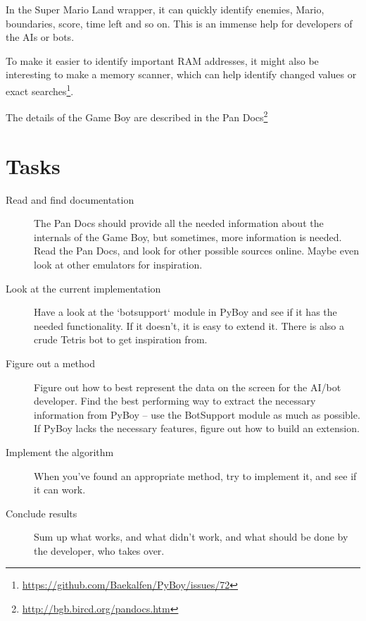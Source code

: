 \documentclass[11pt]{report} %
\begin{document}
In the Super Mario Land wrapper, it can quickly identify enemies, Mario, boundaries, score, time left and so on. This is an immense help for developers of the AIs or bots.

To make it easier to identify important RAM addresses, it might also be interesting to make a memory scanner, which can help identify changed values or exact searches\footnote{\url{https://github.com/Baekalfen/PyBoy/issues/72}}.

The details of the Game Boy are described in the Pan Docs\footnote{\url{http://bgb.bircd.org/pandocs.htm}}

\section*{Tasks}
\begin{description}
    \item [Read and find documentation]
        The Pan Docs should provide all the needed information about the internals of the Game Boy, but sometimes, more information is needed. Read the Pan Docs, and look for other possible sources online. Maybe even look at other emulators for inspiration.

    \item [Look at the current implementation]
        Have a look at the `botsupport` module in PyBoy and see if it has the needed functionality. If it doesn't, it is easy to extend it. There is also a crude Tetris bot to get inspiration from.

    \item [Figure out a method]
        Figure out how to best represent the data on the screen for the AI/bot developer. Find the best performing way to extract the necessary information from PyBoy -- use the BotSupport module as much as possible. If PyBoy lacks the necessary features, figure out how to build an extension.

    \item [Implement the algorithm]
        When you've found an appropriate method, try to implement it, and see if it can work.

    \item [Conclude results]
        Sum up what works, and what didn't work, and what should be done by the developer, who takes over.

\end{description}

%
%
\end{document}
